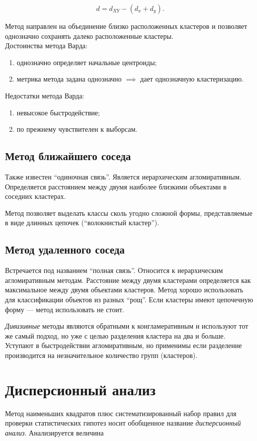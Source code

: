 \documentclass[12pt]{article}
\begin{document}
\[ d = d_{XY} - (d_x + d_y). \]

Метод направлен на объединение близко расположенных кластеров и позволяет однозначно сохранять далеко расположенные кластеры.\\

Достоинства метода Варда:
\begin{enumerate}
    \item однозначно определяет начальные центроиды;
    \item метрика метода задана однозначно $\implies$ дает однозначную кластеризацию.
\end{enumerate}

Недостатки метода Варда:
\begin{enumerate}
    \item невысокое быстродействие;
    \item по прежнему чувствителен к выборсам.
\end{enumerate}

\subsection{Метод ближайшего соседа}
Также известен \enquote{одиночная связь}. Является иерархическим агломиративным. Определяется расстоянием между двумя наиболее близкими объектами в соседних кластерах.

Метод позволяет выделать классы сколь угодно сложной формы, представляемые в виде длинных цепочек (\enquote{волокнистый кластер}).

\subsection{Метод удаленного соседа}
Встречается под названием \enquote{полная связь}. Относится к иерархическим агломиративным методам. Расстояние между двумя кластерами определяется как максимальное между двумя объектами кластеров. Метод хорошо использовать для классификации объектов из разных \enquote{рощ}. Если кластеры имеют цепочечную форму --- метод использовать не стоит.

\emph{Дивизивные} методы являются обратными к конгламеративным и используют тот же самый подход, но уже с целью разделения кластера на два и больше. Уступают в быстродействии агломиративным, но применимы если разделение производится на незначительное количество групп (кластеров).

\newpage
\section{Дисперсионный анализ}
Метод наименьших квадратов плюс систематизированный набор правил для проверки статистических гипотез носит обобщенное название \emph{дисперсионный анализ}. Анализируется величина
\end{document}
